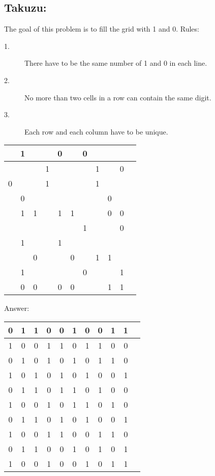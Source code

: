 \documentclass{article}
\begin{document}
\subsection*{Takuzu:}
The goal of this problem is to fill the grid with 1 and 0. 
Rules:
\begin{description}
\item[1.] There have to be the same number of 1 and 0 in each line.
\item[2.] No more than two cells in a row can contain the same digit.
\item[3.] Each row and each column have to be unique.
\end{description}

\begin{table}[ht]
\centering
\begin{tabular}{|c|c|c|c|c|c|c|c|c|c|c|}
\hline   & 1 &   &   & 0 &   & 0 &   &   &   \\ 
\hline   &   &   & 1 &   &   &   & 1 &   & 0 \\ 
\hline 0 &   &   & 1 &   &   &   & 1 &   &   \\ 
\hline   & 0 &   &   &   &   &   &   & 0 &   \\ 
\hline   & 1 & 1 &   & 1 & 1 &   &   & 0 & 0 \\ 
\hline   &   &   &   &   &   & 1 &   &   & 0 \\ 
\hline   & 1 &   &   & 1 &   &   &   &   &   \\ 
\hline   &   & 0 &   &   & 0 &   & 1 & 1 &   \\ 
\hline   & 1 &   &   &   &   & 0 &   &   & 1 \\ 
\hline   & 0 & 0 &   & 0 & 0 &   &   & 1 & 1 \\
\hline
\end{tabular}
\end{table} 

Answer:
\begin{table}[ht]
\centering
\begin{tabular}{|c|c|c|c|c|c|c|c|c|c|c|}
\hline 0 & 1 & 1 & 0 & 0 & 1 & 0 & 0 & 1 & 1 \\ 
\hline 1 & 0 & 0 & 1 & 1 & 0 & 1 & 1 & 0 & 0 \\ 
\hline 0 & 1 & 0 & 1 & 0 & 1 & 0 & 1 & 1 & 0 \\ 
\hline 1 & 0 & 1 & 0 & 1 & 0 & 1 & 0 & 0 & 1 \\ 
\hline 0 & 1 & 1 & 0 & 1 & 1 & 0 & 1 & 0 & 0 \\ 
\hline 1 & 0 & 0 & 1 & 0 & 1 & 1 & 0 & 1 & 0 \\ 
\hline 0 & 1 & 1 & 0 & 1 & 0 & 1 & 0 & 0 & 1 \\ 
\hline 1 & 0 & 0 & 1 & 1 & 0 & 0 & 1 & 1 & 0 \\ 
\hline 0 & 1 & 1 & 0 & 0 & 1 & 0 & 1 & 0 & 1 \\ 
\hline 1 & 0 & 0 & 1 & 0 & 0 & 1 & 0 & 1 & 1 \\
\hline
\end{tabular}
\end{table} 
\end{document}
